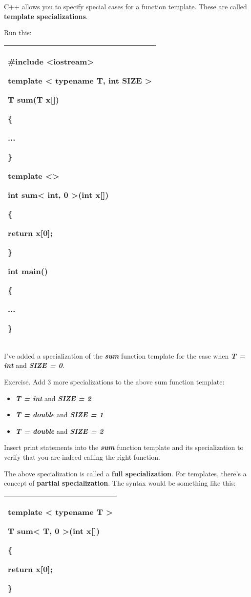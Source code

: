 \documentclass[
]{article}
\providecommand{\tightlist}{%
  \setlength{\itemsep}{0pt}\setlength{\parskip}{0pt}}
\begin{document}
C++ allows you to specify special cases for a function template. These
are called \textbf{template specializations}.

Run this:

\begin{longtable}[]{@{}l@{}}
\toprule
\endhead
\begin{minipage}[t]{0.97\columnwidth}\raggedright
\#include \textless iostream\textgreater{}

template \textless{} typename T, int SIZE \textgreater{}

T sum(T x{[}{]})

\{

...

\}

template \textless\textgreater{}

int sum\textless{} int, 0 \textgreater(int x{[}{]})

\{

return x{[}0{]};

\}

int main()

\{

...

\}\strut
\end{minipage}\tabularnewline
\bottomrule
\end{longtable}

I've added a specialization of the \emph{\textbf{sum}} function template
for the case when \emph{\textbf{T = int}} and \emph{\textbf{SIZE = 0}}.

Exercise. Add 3 more specializations to the above sum function template:

\begin{itemize}
\tightlist
\item
  \emph{\textbf{T = int}} and \emph{\textbf{SIZE = 2}}
\item
  \emph{\textbf{T = double}} and \emph{\textbf{SIZE = 1}}
\item
  \emph{\textbf{T = double}} and \emph{\textbf{SIZE = 2}}
\end{itemize}

Insert print statements into the \emph{\textbf{sum}} function template
and its specialization to verify that you are indeed calling the right
function.

The above specialization is called a \textbf{full specialization}. For
templates, there's a concept of \textbf{partial specialization}. The
syntax would be something like this:

\begin{longtable}[]{@{}l@{}}
\toprule
\endhead
\begin{minipage}[t]{0.97\columnwidth}\raggedright
template \textless{} typename T \textgreater{}

T sum\textless{} T, 0 \textgreater(int x{[}{]})

\{

return x{[}0{]};

\}\strut
\end{minipage}\tabularnewline
\bottomrule
\end{longtable}
\end{document}
